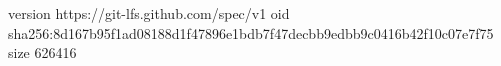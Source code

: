 version https://git-lfs.github.com/spec/v1
oid sha256:8d167b95f1ad08188d1f47896e1bdb7f47decbb9edbb9c0416b42f10c07e7f75
size 626416
